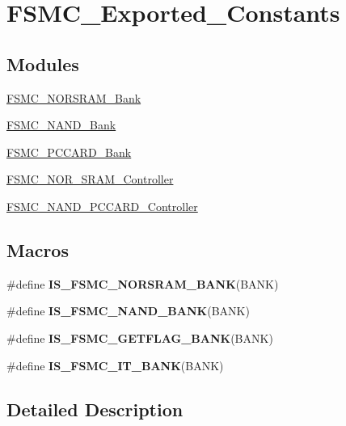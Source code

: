\hypertarget{group___f_s_m_c___exported___constants}{}\section{F\+S\+M\+C\+\_\+\+Exported\+\_\+\+Constants}
\label{group___f_s_m_c___exported___constants}
\subsection*{Modules}
\begin{DoxyCompactItemize}
\item 
\hyperlink{group___f_s_m_c___n_o_r_s_r_a_m___bank}{F\+S\+M\+C\+\_\+\+N\+O\+R\+S\+R\+A\+M\+\_\+\+Bank}
\item 
\hyperlink{group___f_s_m_c___n_a_n_d___bank}{F\+S\+M\+C\+\_\+\+N\+A\+N\+D\+\_\+\+Bank}
\item 
\hyperlink{group___f_s_m_c___p_c_c_a_r_d___bank}{F\+S\+M\+C\+\_\+\+P\+C\+C\+A\+R\+D\+\_\+\+Bank}
\item 
\hyperlink{group___f_s_m_c___n_o_r___s_r_a_m___controller}{F\+S\+M\+C\+\_\+\+N\+O\+R\+\_\+\+S\+R\+A\+M\+\_\+\+Controller}
\item 
\hyperlink{group___f_s_m_c___n_a_n_d___p_c_c_a_r_d___controller}{F\+S\+M\+C\+\_\+\+N\+A\+N\+D\+\_\+\+P\+C\+C\+A\+R\+D\+\_\+\+Controller}
\end{DoxyCompactItemize}
\subsection*{Macros}
\begin{DoxyCompactItemize}
\item 
\#define {\bfseries I\+S\+\_\+\+F\+S\+M\+C\+\_\+\+N\+O\+R\+S\+R\+A\+M\+\_\+\+B\+A\+N\+K}(B\+A\+N\+K)
\item 
\#define {\bfseries I\+S\+\_\+\+F\+S\+M\+C\+\_\+\+N\+A\+N\+D\+\_\+\+B\+A\+N\+K}(B\+A\+N\+K)
\item 
\#define {\bfseries I\+S\+\_\+\+F\+S\+M\+C\+\_\+\+G\+E\+T\+F\+L\+A\+G\+\_\+\+B\+A\+N\+K}(B\+A\+N\+K)
\item 
\#define {\bfseries I\+S\+\_\+\+F\+S\+M\+C\+\_\+\+I\+T\+\_\+\+B\+A\+N\+K}(B\+A\+N\+K)
\end{DoxyCompactItemize}


\subsection{Detailed Description}


